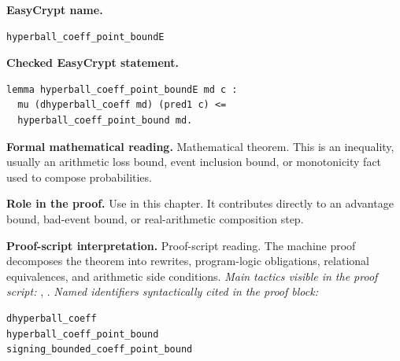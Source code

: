 \begin{formaltheorem}
\noindent\textbf{EasyCrypt name.}
\begin{lstlisting}[language=EasyCrypt,basicstyle=\ttfamily\scriptsize]
hyperball_coeff_point_boundE
\end{lstlisting}
\noindent\textbf{Checked EasyCrypt statement.}
\begin{lstlisting}[language=EasyCrypt,basicstyle=\ttfamily\scriptsize]
lemma hyperball_coeff_point_boundE md c :
  mu (dhyperball_coeff md) (pred1 c) <=
  hyperball_coeff_point_bound md.
\end{lstlisting}
\noindent\textbf{Formal mathematical reading.}
Mathematical theorem. This is an inequality, usually an arithmetic loss bound, event inclusion bound, or monotonicity fact used to compose probabilities.

\noindent\textbf{Role in the proof.}
Use in this chapter. It contributes directly to an advantage bound, bad-event bound, or real-arithmetic composition step.

\noindent\textbf{Proof-script interpretation.}
Proof-script reading. The machine proof decomposes the theorem into rewrites, program-logic obligations, relational equivalences, and arithmetic side conditions.
\emph{Main tactics visible in the proof script:} , .
\emph{Named identifiers syntactically cited in the proof block:}
\begin{lstlisting}[language=EasyCrypt,basicstyle=\ttfamily\scriptsize]
dhyperball_coeff
hyperball_coeff_point_bound
signing_bounded_coeff_point_bound
\end{lstlisting}

\end{formaltheorem}

